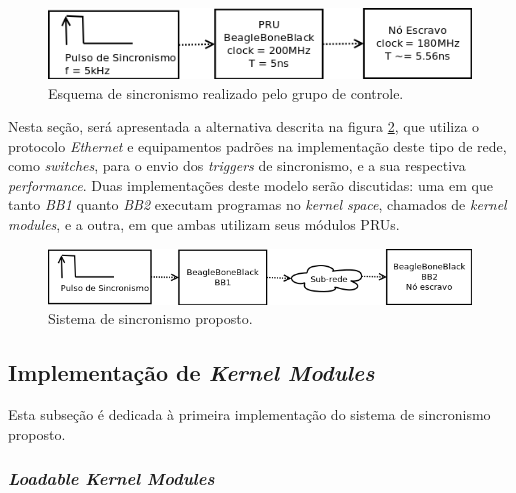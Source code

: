 \begin{figure}[h]

\centering
\includegraphics[scale=0.65]{image/pru_bbb_sincronismo}
\caption {Esquema de sincronismo realizado pelo grupo de controle.}
\label{fig:pru_sincronismo}
\end{figure}

\vspace{12pt}

Nesta seção, será apresentada a alternativa descrita na figura
\ref{fig:pru_sincronismo_ethernet}, que utiliza o protocolo \textit{Ethernet} e
equipamentos padrões na implementação deste tipo de rede, como
\textit{switches}, para o envio dos \textit{triggers} de sincronismo, e a sua
respectiva \textit{performance}. Duas implementações deste modelo serão
discutidas: uma em que tanto \textit{BB1} quanto \textit{BB2} executam
programas no \textit{kernel space}, chamados de \textit{kernel modules}, e a
outra, em que ambas utilizam seus módulos PRUs.

\vspace{12pt}

\begin{figure}[h]

\centering
\includegraphics[scale=0.65]{image/pru_bbb_sincronismo_ethernet}
\caption {Sistema de sincronismo proposto.}
\label{fig:pru_sincronismo_ethernet}
\end{figure}

\subsection {Implementação de \textit{Kernel Modules}}

Esta subseção é dedicada à primeira implementação do sistema de sincronismo
proposto.

\subsubsection{\textit{Loadable Kernel Modules}}

